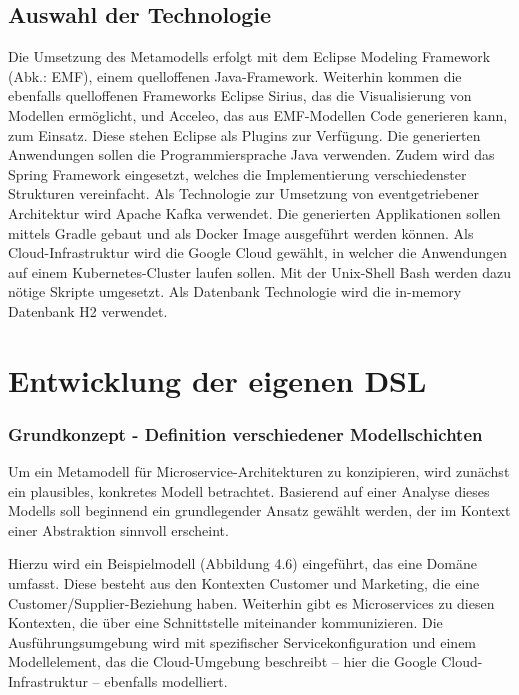 \subsection{Auswahl der Technologie}

Die Umsetzung des Metamodells erfolgt mit dem Eclipse Modeling Framework (Abk.: EMF), einem quelloffenen Java-Framework. Weiterhin kommen die ebenfalls quelloffenen Frameworks Eclipse Sirius, das die Visualisierung von Modellen ermöglicht, und Acceleo, das aus EMF-Modellen Code generieren kann, zum Einsatz. Diese stehen Eclipse als Plugins zur Verfügung. Die generierten Anwendungen sollen die Programmiersprache Java verwenden. Zudem wird das Spring Framework eingesetzt, welches die Implementierung verschiedenster Strukturen vereinfacht. Als Technologie zur Umsetzung von eventgetriebener Architektur wird Apache Kafka verwendet. Die generierten Applikationen sollen mittels Gradle gebaut und als Docker Image ausgeführt werden können. Als Cloud-Infrastruktur wird die Google Cloud gewählt, in welcher die Anwendungen auf einem Kubernetes-Cluster laufen sollen. Mit der Unix-Shell Bash werden dazu nötige Skripte umgesetzt. Als Datenbank Technologie wird die in-memory Datenbank H2 verwendet.



\newpage
\section{Entwicklung der eigenen DSL}

\subsubsection{Grundkonzept - Definition verschiedener Modellschichten}

Um ein Metamodell für Microservice-Architekturen zu konzipieren, wird zunächst ein plausibles, konkretes Modell betrachtet. Basierend auf einer Analyse dieses Modells soll beginnend ein grundlegender Ansatz gewählt werden, der im Kontext einer Abstraktion sinnvoll erscheint.

Hierzu wird ein Beispielmodell (Abbildung 4.6) eingeführt, das eine Domäne umfasst. Diese besteht aus den Kontexten Customer und Marketing, die eine Customer/Supplier-Beziehung haben. Weiterhin gibt es Microservices zu diesen Kontexten, die über eine Schnittstelle miteinander kommunizieren. Die Ausführungsumgebung wird mit spezifischer Servicekonfiguration und einem Modellelement, das die Cloud-Umgebung beschreibt – hier die Google Cloud-Infrastruktur – ebenfalls modelliert.

